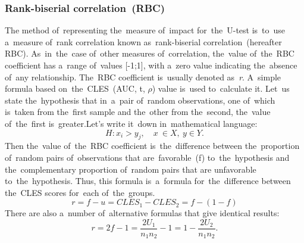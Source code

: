 \documentclass[]{scrreprt}
\begin{document}
\subsubsection{Rank-biserial correlation~(RBC)}
The method of~representing the~measure of~impact for~the~U-test is~to~use a~measure of~rank correlation known as~rank-biserial correlation~(hereafter RBC). As~in~the~case of~other measures of~correlation, the~value of~the~RBC coefficient has a~range of~values [-1;1], with a~zero value indicating the~absence of~any relationship. The~RBC coefficient is~usually denoted as~\textit{r}. A~simple formula based on~the~CLES~(AUC, t, $\rho$) value is~used to~calculate it. Let~us state the~hypothesis that in~a~pair of~random observations, one of~which is~taken from the~first sample and the~other from the~second, the~value of~the~first is~greater.Let's write it~down in~mathematical language:
\begin{equation}\label{eq:RBC-hypothesis}
H: x_{i} > y_{j}, \quad x \ \in X,\ y \in Y.
\end{equation}
Then the~value of~the~RBC coefficient is~the~difference between the~proportion of~random pairs of~observations that are~favorable~(f) to~the~hypothesis and the~complementary proportion of~random pairs that are unfavorable to~the~hypothesis. Thus, this formula is~a~formula for~the~difference between the~CLES scores for~each of~the~groups.
\begin{equation}\label{eq:RBC-formula-1}
r = f - u = CLES_{1} - CLES_{2} = f - (1 - f)
\end{equation}
There are also a~number of~alternative formulas that give identical results:
\begin{equation}\label{eq:RBC-formula-2}
r = 2f -1 = \frac{2U_{1}}{n_{1}n_{2}}-1 = 1 - \frac{2U_{2}}{n_{1}n_{2}}.
\end{equation}
%
\end{document}
